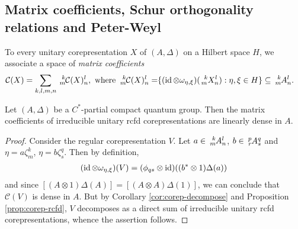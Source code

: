 \subsection{Matrix coefficients, Schur orthogonality relations and Peter-Weyl}


To every unitary corepresentation $X$ of $(A,\Delta)$ on a Hilbert space $H$, we associate a space
of \emph{matrix coefficients}
\begin{align*}
\mathcal{C}(X) = \sum_{k,l,m,n}  \Gr{\mathcal{C}(X)}{k}{l}{m}{n},
\text{ where } \Gr{\mathcal{C}(X)}{k}{l}{m}{n} = \span \{ (\id \otimes
  \omega_{\eta,\xi})(\Gr{X}{k}{l}{m}{n}) : \eta,\xi \in H\} \subseteq
  \Gr{A}{k}{l}{m}{n}.
\end{align*}

\begin{Prop} \label{prop:matrix-coefficients-dense}    Let $(A,\Delta)$ be a $C^{*}$-partial compact quantum group.   Then the matrix coefficients of irreducible unitary rcfd corepresentations
  are linearly dense in $A$. 
\end{Prop}
\begin{proof}
  Consider the regular corepresentation $V$. Let $a\in \Gr{A}{k}{l}{m}{n}$, $b\in
  \Gr{A}{p}{q}{r}{s}$ and $\eta=a\zeta^{k}_{m}$, $\eta=b\zeta^{q}_{s}$. Then by definition,
  \begin{align*}
    (\operatorname{id} \otimes \omega_{\eta,\xi})(V) = (\phi_{qs}\otimes \operatorname{id})((b^{*} \otimes
    1)\Delta(a))
  \end{align*}
  and since $[(A\otimes 1)\Delta(A)]=[(A\otimes A)\Delta(1)]$, we can conclude that $\mathcal{C}(V)$
  is dense in $A$. But by Corollary \ref{cor:corep-decompose} and Proposition \ref{prop:corep-rcfd}, $V$ decomposes as a direct sum of
  irreducible unitary rcfd corepresentations, whence the assertion follows.
\end{proof}


